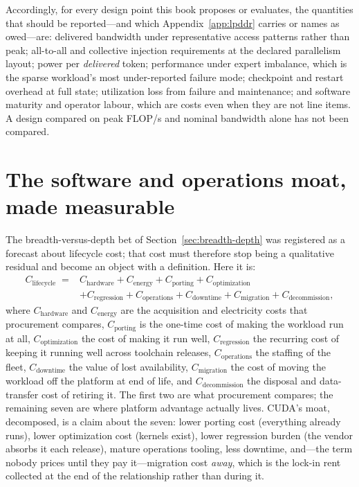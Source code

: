 Accordingly, for every design point this book proposes or evaluates, the quantities that should be reported---and which Appendix~\ref{app:lpddr} carries or names as owed---are: delivered bandwidth under representative access patterns rather than peak; all-to-all and collective injection requirements at the declared parallelism layout; power per \emph{delivered} token; performance under expert imbalance, which is the sparse workload's most under-reported failure mode; checkpoint and restart overhead at full state; utilization loss from failure and maintenance; and software maturity and operator labour, which are costs even when they are not line items. A design compared on peak FLOP/s and nominal bandwidth alone has not been compared.

\section{The software and operations moat, made measurable}
\label{sec:lifecycle}

The breadth-versus-depth bet of Section~\ref{sec:breadth-depth} was registered as a forecast about lifecycle cost; that cost must therefore stop being a qualitative residual and become an object with a definition. Here it is:
\begin{align}
C_{\mathrm{lifecycle}} \;={}& C_{\mathrm{hardware}} + C_{\mathrm{energy}} + C_{\mathrm{porting}} + C_{\mathrm{optimization}} \nonumber\\
&+ C_{\mathrm{regression}} + C_{\mathrm{operations}} + C_{\mathrm{downtime}} + C_{\mathrm{migration}} + C_{\mathrm{decommission}},
\label{eq:lifecycle}
\end{align}
where $C_{\mathrm{hardware}}$ and $C_{\mathrm{energy}}$ are the acquisition and electricity costs that procurement compares, $C_{\mathrm{porting}}$ is the one-time cost of making the workload run at all, $C_{\mathrm{optimization}}$ the cost of making it run well, $C_{\mathrm{regression}}$ the recurring cost of keeping it running well across toolchain releases, $C_{\mathrm{operations}}$ the staffing of the fleet, $C_{\mathrm{downtime}}$ the value of lost availability, $C_{\mathrm{migration}}$ the cost of moving the workload off the platform at end of life, and $C_{\mathrm{decommission}}$ the disposal and data-transfer cost of retiring it. The first two are what procurement compares; the remaining seven are where platform advantage actually lives. CUDA's moat, decomposed, is a claim about the seven: lower porting cost (everything already runs), lower optimization cost (kernels exist), lower regression burden (the vendor absorbs it each release), mature operations tooling, less downtime, and---the term nobody prices until they pay it---migration cost \emph{away}, which is the lock-in rent collected at the end of the relationship rather than during it.

